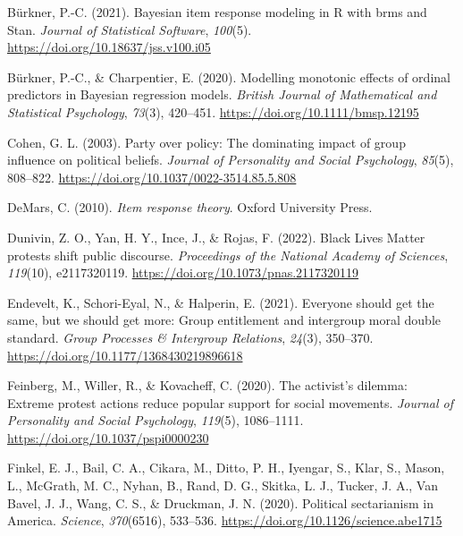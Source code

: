 \documentclass[12pt, letterpaper]{article}
\newenvironment{CSLReferences}[2]{}{}
\begin{document}
\begin{CSLReferences}{1}{0}
\leavevmode{}%
Bürkner, P.-C. (2021). Bayesian item response modeling in {R} with brms
and {Stan}. \emph{Journal of Statistical Software}, \emph{100}(5).
\url{https://doi.org/10.18637/jss.v100.i05}

\leavevmode{}%
Bürkner, P.-C., \& Charpentier, E. (2020). Modelling monotonic effects
of ordinal predictors in {Bayesian} regression models. \emph{British
Journal of Mathematical and Statistical Psychology}, \emph{73}(3),
420--451. \url{https://doi.org/10.1111/bmsp.12195}

\leavevmode{}%
Cohen, G. L. (2003). Party over policy: The dominating impact of group
influence on political beliefs. \emph{Journal of Personality and Social
Psychology}, \emph{85}(5), 808--822.
\url{https://doi.org/10.1037/0022-3514.85.5.808}

\leavevmode{}%
DeMars, C. (2010). \emph{Item response theory}. Oxford University Press.

\leavevmode{}%
Dunivin, Z. O., Yan, H. Y., Ince, J., \& Rojas, F. (2022). Black {Lives}
{Matter} protests shift public discourse. \emph{Proceedings of the
National Academy of Sciences}, \emph{119}(10), e2117320119.
\url{https://doi.org/10.1073/pnas.2117320119}

\leavevmode{}%
Endevelt, K., Schori-Eyal, N., \& Halperin, E. (2021). Everyone should
get the same, but we should get more: Group entitlement and intergroup
moral double standard. \emph{Group Processes \& Intergroup Relations},
\emph{24}(3), 350--370. \url{https://doi.org/10.1177/1368430219896618}

\leavevmode{}%
Feinberg, M., Willer, R., \& Kovacheff, C. (2020). The activist's
dilemma: {Extreme} protest actions reduce popular support for social
movements. \emph{Journal of Personality and Social Psychology},
\emph{119}(5), 1086--1111. \url{https://doi.org/10.1037/pspi0000230}

\leavevmode{}%
Finkel, E. J., Bail, C. A., Cikara, M., Ditto, P. H., Iyengar, S., Klar,
S., Mason, L., McGrath, M. C., Nyhan, B., Rand, D. G., Skitka, L. J.,
Tucker, J. A., Van Bavel, J. J., Wang, C. S., \& Druckman, J. N. (2020).
Political sectarianism in {America}. \emph{Science}, \emph{370}(6516),
533--536. \url{https://doi.org/10.1126/science.abe1715}


\end{CSLReferences}
\end{document}
